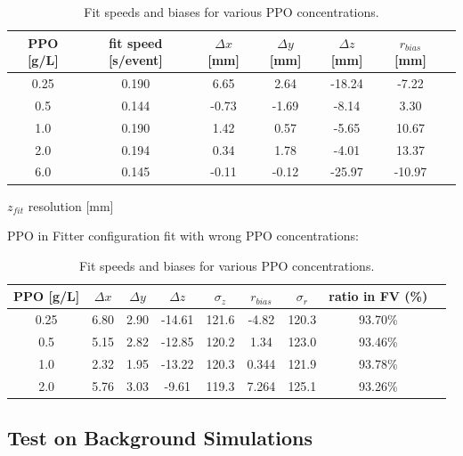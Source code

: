 \begin{table}[ht]
	\centering
	\caption{\label{partial_bias} Fit speeds and biases for various PPO concentrations.}	
	{\centering
		\begin{tabular*}{145         mm}{c@{\extracolsep{\fill}}cccccc}
			\toprule 
			PPO [g/L] & fit speed [s/event]& $\Delta x$ [mm]& $\Delta y$ [mm]& $\Delta z$ [mm] & $r_{bias}$ [mm] & \\
			\midrule
			0.25 & 0.190 &6.65 &2.64& -18.24& -7.22\\
			0.5  & 0.144 &-0.73 &-1.69& -8.14& 3.30 \\
			1.0 &0.190 & 1.42 &0.57 &-5.65& 10.67 \\
			2.0 &0.194 & 0.34 &1.78& -4.01& 13.37	\\
			6.0 &0.145 & -0.11& -0.12& -25.97& -10.97\\
			\bottomrule	
		\end{tabular*}
	}
\end{table}

$z_{fit}$ resolution [mm] 


PPO in Fitter configuration
fit with wrong PPO concentrations:  
\begin{table}[ht]
	\centering
	\caption{\label{partial_bias1} Fit speeds and biases for various PPO concentrations.}	
	{\centering
		\begin{tabular*}{140mm}{c@{\extracolsep{\fill}}cccccccc}
			\toprule 
			PPO [g/L] & $\Delta x$ & $\Delta y$ & $\Delta z$  & $\sigma_z$ & $r_{bias}$  & $\sigma_r$ & ratio in FV (\%)&\\
			\midrule
			0.25 & 6.80& 2.90& -14.61& 121.6& -4.82& 120.3& 93.70\%\\
			0.5  & 5.15& 2.82& -12.85 &120.2 &1.34 &123.0 &93.46\% \\
			1.0 &2.32 &1.95 &-13.22& 120.3& 0.344& 121.9 &93.78\% \\
			2.0 &5.76& 3.03& -9.61& 119.3& 7.264 &125.1& 93.26\% \\
			\bottomrule	
		\end{tabular*}
	}
\end{table}

\subsection{Test on Background Simulations}


